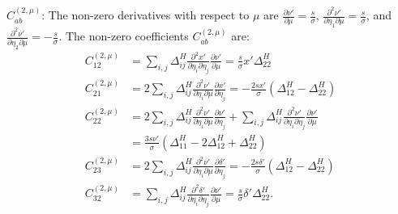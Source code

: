\documentclass{article}
\begin{document}
$C^{(2,\mu)}_{ab}$:
The non-zero derivatives with respect to $\mu$ are $\frac{\partial \nu'}{\partial \mu} = \frac{s}{\sigma}$, $\frac{\partial^2 \nu'}{\partial \eta_1 \partial \mu} = \frac{s}{\sigma}$, and $\frac{\partial^2 \nu'}{\partial \eta_2 \partial \mu} = -\frac{s}{\sigma}$.
The non-zero coefficients $C^{(2,\mu)}_{ab}$ are:
%
\begin{align}
  C^{(2,\mu)}_{12} & = \sum_{i,j} \Delta^H_{ij} \frac{\partial^2 x'}{\partial\eta_i\partial\eta_j}\frac{\partial \nu'}{\partial \mu} = \frac{s}{\sigma} x' \Delta^H_{22}                                                                                   \\
  C^{(2,\mu)}_{21} & = 2 \sum_{i,j} \Delta^H_{ij} \frac{\partial^2 \nu'}{\partial\eta_i\partial \mu}\frac{\partial x'}{\partial\eta_j} = -\frac{2sx'}{\sigma}(\Delta^H_{12} - \Delta^H_{22})                                                               \\
  C^{(2,\mu)}_{22} & = 2 \sum_{i,j} \Delta^H_{ij} \frac{\partial^2 \nu'}{\partial\eta_i\partial \mu}\frac{\partial \nu'}{\partial\eta_j} + \sum_{i,j} \Delta^H_{ij} \frac{\partial^2 \nu'}{\partial\eta_i\partial\eta_j}\frac{\partial \nu'}{\partial \mu} \\
                   & = \frac{3s\nu'}{\sigma}(\Delta^H_{11}-2\Delta^H_{12}+\Delta^H_{22})                                                                                                                                                                   \\
  C^{(2,\mu)}_{23} & = 2 \sum_{i,j} \Delta^H_{ij} \frac{\partial^2 \nu'}{\partial\eta_i\partial \mu}\frac{\partial \delta'}{\partial\eta_j} = -\frac{2s\delta'}{\sigma}(\Delta^H_{12} - \Delta^H_{22})                                                     \\
  C^{(2,\mu)}_{32} & = \sum_{i,j} \Delta^H_{ij} \frac{\partial^2 \delta'}{\partial\eta_i\partial\eta_j}\frac{\partial \nu'}{\partial \mu} = \frac{s}{\sigma} \delta' \Delta^H_{22}.
\end{align}
\end{document}
